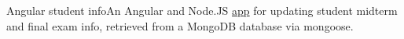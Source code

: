 \datedsubsection{}
{Angular student info}{}{An Angular and Node.JS \href{https://github.com/jacobarchambault/angular-students}{app} for updating  student midterm and final exam info, retrieved from a  MongoDB database via mongoose.}